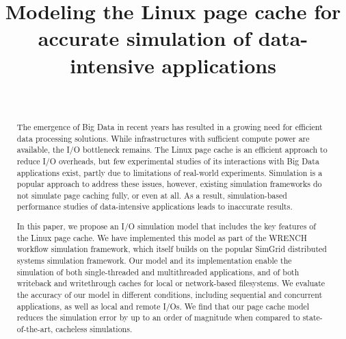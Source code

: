 \documentclass[conference]{IEEEtran}
\newcommand{\simgrid}{SimGrid\xspace}
\newcommand{\wrench}{WRENCH\xspace}
\begin{document}
\title{Modeling the Linux page cache for accurate simulation of data-intensive applications}

\author{
  \\
}

\maketitle

    \begin{abstract}

    The emergence of Big Data in recent years has resulted in a growing
    need for efficient data processing solutions. While infrastructures
    with sufficient compute power are available,
    the I/O bottleneck remains. The Linux page cache is an efficient
    approach to reduce I/O overheads, but few
    experimental studies of its interactions with Big Data applications exist,
    partly due to limitations of
    real-world experiments. Simulation is a popular approach to address
    these issues, however, existing simulation frameworks do not simulate
    page caching fully, or even at all.  As a result, simulation-based
    performance studies of data-intensive applications leads to inaccurate
    results.

    In this paper, we propose an I/O simulation model that includes
    the key features of the Linux page cache. We have implemented this model
    as part of the \wrench workflow simulation framework, which itself
    builds on the popular \simgrid distributed systems simulation
    framework. Our model and its implementation enable the simulation
    of both single-threaded and multithreaded applications, and of both
    writeback and writethrough caches for local or network-based
    filesystems. We evaluate the accuracy of our model in different
    conditions, including sequential and concurrent applications, as
    well as local and remote I/Os. We find that our page cache model
    reduces the simulation error by up to an order of magnitude when
    compared to state-of-the-art, cacheless simulations.

    \end{abstract}
\end{document}
